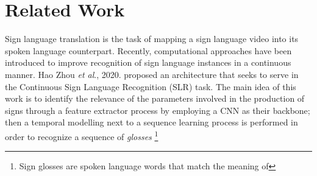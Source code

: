 \section{Related Work}
\label{sec:current_work}

Sign language translation is the task of mapping a sign language video into its spoken language counterpart. Recently, computational approaches have been introduced to improve recognition of sign language instances in a continuous manner. Hao Zhou \textit{et al}., 2020. \cite{9354538} proposed an architecture that seeks to serve in the Continuous Sign Language Recognition (SLR) task. The main idea of this work is to identify the relevance of the parameters involved in the production of signs through a feature extractor process by employing a CNN as their backbone; then a temporal modelling next to a sequence learning process is performed in order to recognize a sequence of \textit{glosses} \footnote{Sign glosses are spoken language words that match the meaning of
}
